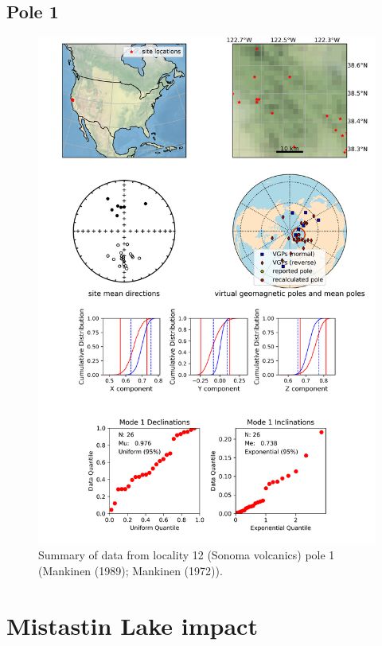 \documentclass{article}
\begin{document}
\subsection{Pole 1}


\begin{figure}[H]
\centering
\includegraphics[width=5 in]{./12/1/pole_summary.png}
\caption{Summary of data from locality 12 (Sonoma volcanics) pole 1 (Mankinen (1989); Mankinen (1972)).}
\end{figure}

\section{Mistastin Lake impact}
\end{document}

